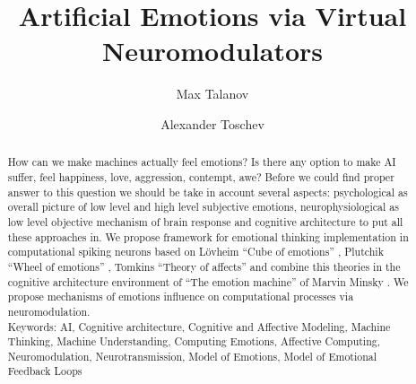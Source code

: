 \documentclass[oribibl]{llncs}
\begin{document}
\title{Artificial Emotions via Virtual Neuromodulators}
\author{Max Talanov \and Alexander Toschev}
\maketitle
\begin{abstract}
How can we make machines actually feel emotions? Is there any option to make AI suffer, feel happiness, love, aggression, contempt, awe? Before we could find proper answer to this question we should be take in account several aspects: psychological as overall picture of low level and high level subjective emotions, neurophysiological as low level objective mechanism of brain response and cognitive architecture to put all these approaches in. We propose framework for emotional thinking implementation in computational spiking neurons based on L\"{o}vheim ``Cube of emotions'' \cite{cubeofemotions} , Plutchik ``Wheel of emotions'' \cite{natureofemotions}, Tomkins ``Theory of affects'' \cite{primer_affect_psychology} and combine this theories in the cognitive architecture environment of ``The emotion machine'' of Marvin Minsky \cite{emotionmachine}. We propose mechanisms of emotions influence on computational processes via neuromodulation.\\
Keywords: AI, Cognitive architecture, Cognitive and Affective Modeling, Machine Thinking, Machine Understanding, Computing Emotions, Affective Computing, Neuromodulation, Neurotransmission, Model of Emotions, Model of Emotional Feedback Loops
\end{abstract}



\end{document}

